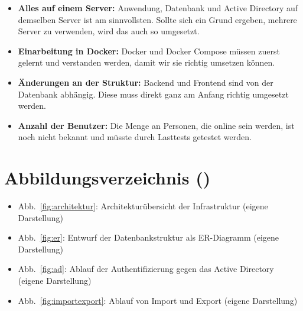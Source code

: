 \begin{itemize}
  \item \textbf{Alles auf einem Server:} Anwendung, Datenbank und Active Directory auf demselben Server ist am sinnvollsten. Sollte sich ein Grund ergeben, mehrere Server zu verwenden, wird das auch so umgesetzt.
  \item \textbf{Einarbeitung in Docker:} Docker und Docker Compose müssen zuerst gelernt und verstanden werden, damit wir sie richtig umsetzen können.
  \item \textbf{Änderungen an der Struktur:} Backend und Frontend sind von der Datenbank abhängig. Diese muss direkt ganz am Anfang richtig umgesetzt werden.
  \item \textbf{Anzahl der Benutzer:} Die Menge an Personen, die online sein werden, ist noch nicht bekannt und müsste durch Lasttests getestet werden.
\end{itemize}
 
\section*{Abbildungsverzeichnis (\Jai)}
 
\begin{itemize}
  \item Abb.~\ref{fig:architektur}: Architekturübersicht der Infrastruktur (eigene Darstellung)
  \item Abb.~\ref{fig:er}: Entwurf der Datenbankstruktur als ER-Diagramm (eigene Darstellung)
  \item Abb.~\ref{fig:ad}: Ablauf der Authentifizierung gegen das Active Directory (eigene Darstellung)
  \item Abb.~\ref{fig:importexport}: Ablauf von Import und Export (eigene Darstellung)
\end{itemize}

